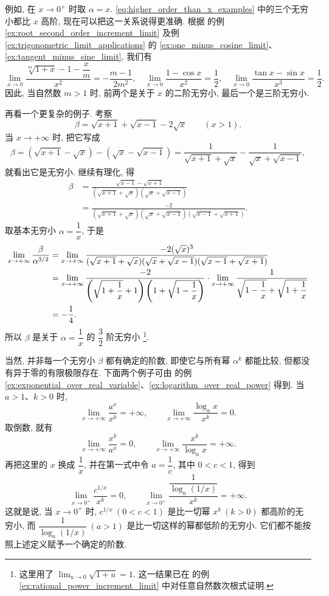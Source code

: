 例如, 在 $x\to0^+$ 时取 $\alpha=x$.
\eqref{eq:higher_order_than_x_examples} 中的三个无穷小都比 $x$ 高阶,
现在可以把这一关系说得更准确.
根据  的例 \ref{ex:root_second_order_increment_limit}
及例 \ref{ex:trigonometric_limit_applications} 的
\ref{ex:one_minus_cosine_limit}、\ref{ex:tangent_minus_sine_limit}, 我们有
$$
\lim_{x\to0}\frac{\sqrt[m]{1+x}-1-\dfrac xm}{x^2}
=-\frac{m-1}{2m^2},\quad
\lim_{x\to0}\frac{1-\cos x}{x^2}=\frac12,\quad
\lim_{x\to0}\frac{\tan x-\sin x}{x^3}=\frac12.
$$
因此, 当自然数 $m>1$ 时, 前两个是关于 $x$ 的二阶无穷小,
最后一个是三阶无穷小.

再看一个更复杂的例子. 
考察
$$
\beta=\sqrt{x+1}+\sqrt{x-1}-2\sqrt{x}\qquad(x>1).
$$
当 $x\to+\infty$ 时, 把它写成
$$
\beta=(\sqrt{x+1}-\sqrt{x})-(\sqrt{x}-\sqrt{x-1})=\frac1{\sqrt{x+1}+\sqrt{x}}-\frac1{\sqrt{x}+\sqrt{x-1}},
$$
就看出它是无穷小. 继续有理化, 得
$$
\begin{aligned}
\beta&=\frac{\sqrt{x-1}-\sqrt{x+1}}
{(\sqrt{x+1}+\sqrt{x})(\sqrt{x}+\sqrt{x-1})}\\
&=\frac{-2}
{(\sqrt{x+1}+\sqrt{x})(\sqrt{x}+\sqrt{x-1})(\sqrt{x-1}+\sqrt{x+1})}.
\end{aligned}
$$
取基本无穷小 $\alpha=\dfrac1x$, 于是
\begin{equation}\label{eq:radical_difference_order_three_halves}
\begin{aligned}
\lim_{x\to+\infty}\frac\beta{\alpha^{3/2}}
&=\lim_{x\to+\infty}\frac{-2(\sqrt{x})^3}
{(\sqrt{x+1}+\sqrt{x})(\sqrt{x}+\sqrt{x-1})(\sqrt{x-1}+\sqrt{x+1})}\\
&=\lim_{x\to+\infty}\frac{-2}
{\left( \sqrt{1+\dfrac1x}+1 \right)\left( 1+\sqrt{1-\dfrac1x} \right)}
\cdot\lim_{x\to+\infty}\frac1{\sqrt{1-\dfrac1x}+\sqrt{1+\dfrac1x}}\\
&=-\frac14.
\end{aligned}
\end{equation}
所以 $\beta$ 是关于 $\alpha=\dfrac1x$ 的 $\dfrac32$ 阶无穷小
\footnote{这里用了 $\displaystyle\lim_{u\to0}\sqrt{1+u}=1$.
这一结果已在  的例 \ref{ex:rational_power_increment_limit}
中对任意自然数次根式证明.}.

当然, 并非每一个无穷小 $\beta$ 都有确定的阶数,
即使它与所有幂 $\alpha^k$ 都能比较, 但都没有异于零的有限极限存在.
下面两个例子可由  的例
\ref{ex:exponential_over_real_variable}、\ref{ex:logarithm_over_real_power} 得到.
当 $a>1$、$k>0$ 时,
\begin{equation}\label{eq:exponential_logarithm_vs_powers}
\lim_{x\to+\infty}\frac{a^x}{x^k}=+\infty,\qquad
\lim_{x\to+\infty}\frac{\log_a x}{x^k}=0.
\end{equation}
取倒数, 就有
$$
\lim_{x\to+\infty}\frac{x^k}{a^x}=0,\qquad
\lim_{x\to+\infty}\frac{x^k}{\log_a x}=+\infty.
$$
再把这里的 $x$ 换成 $\dfrac1x$, 并在第一式中令 $a=\dfrac1c$, 其中 $0<c<1$,
得到
$$
\lim_{x\to0^+}\frac{c^{1/x}}{x^k}=0,\qquad
\lim_{x\to0^+}\frac{\dfrac1{\log_a(1/x)}}{x^k}=+\infty.
$$
这就是说, 当 $x\to0^+$ 时,
$c^{1/x}\ (0<c<1)$ 是比一切幂 $x^k\ (k>0)$ 都高阶的无穷小,
而 $\dfrac1{\log_a(1/x)}\ (a>1)$ 是比一切这样的幂都低阶的无穷小.
它们都不能按照上述定义赋予一个确定的阶数.

